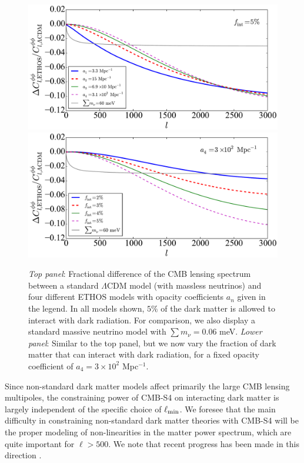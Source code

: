 %
\begin{figure}[h]
\includegraphics[width=\textwidth]{DarkEnergy/ClsPP_ETHOS_a_n.pdf}\\
\includegraphics[width=\textwidth]{DarkEnergy/ClsPP_ETHOS_f_int.pdf}
\caption{\emph{Top panel}: Fractional difference of the CMB lensing spectrum between a standard $\Lambda$CDM model (with massless neutrinos) and four different ETHOS models with opacity coefficients $a_n$ given in the legend. In all models shown, $5\%$ of the dark matter is allowed to interact with dark radiation. For comparison, we also display a standard massive neutrino model with $\sum m_\nu =0.06$ meV. \emph{Lower panel}: Similar to the top panel, but we now vary the fraction of dark matter that can interact with dark radiation, for a fixed opacity coefficient of $a_4 = 3\times 10^2$ Mpc$^{-1}$. }\label{fig:Cls_phi_PIDM}
\end{figure}
%

Since non-standard dark matter models affect primarily the large CMB lensing multipoles, the constraining power of CMB-S4 on interacting dark matter is largely independent of the specific choice of $\ell_{\rm min}$. We foresee that the main difficulty in constraining non-standard dark matter theories with CMB-S4 will be the proper modeling of non-linearities in the matter power spectrum, which are quite important for $\ell > 500$. We note that recent progress has been made in this direction \cite{ETHOS2}.


